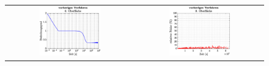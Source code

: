 \documentclass{listhesis}
\begin{document}
\newcommand\ws{0.5}
\begin{figure}[!h]
\centering
\begin{tabular}{@{}cc@{}}
\includegraphics[width=\ws\textwidth]{./include/figure_2.0/old/CovFacet0.eps}&
\includegraphics[width=\ws\textwidth]{./include/figure_2.0/old/CovFacetError0.eps}\\

\end{tabular}
\end{figure}
\end{document}
